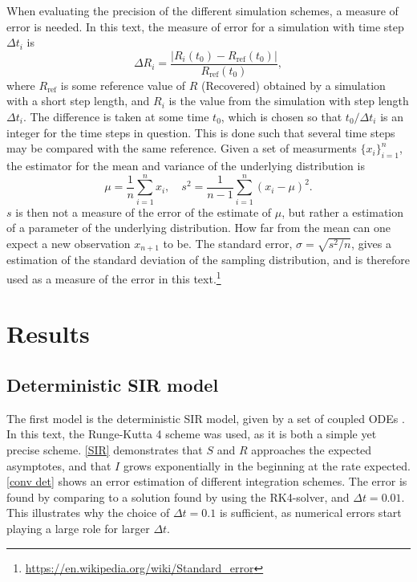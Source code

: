 \documentclass{article}
\begin{document}
    When evaluating the precision of the different simulation schemes, a measure of error is needed.
    In this text, the measure of error for a simulation with time step $\Delta t_i$ is
    \begin{equation*}
        \Delta R_i = \frac{|R_i(t_0) - R_{\mathrm{ref}}(t_0)|}{R_{\mathrm{ref}}(t_0)},
    \end{equation*}
    where $R_{\mathrm{ref}}$ is some reference value of $R$ (Recovered) obtained by a simulation with a short step length, and $R_i$ is the value from the simulation with step length $\Delta t_i$.
    The difference is taken at some time $t_0$, which is chosen so that $t_0/\Delta t_i$ is an integer for the time steps in question.
    This is done such that several time steps may be compared with the same reference.
    Given a set of measurments $\{x_i\}_{i=1}^n$, the estimator for the mean and variance of the underlying distribution is 
    \begin{equation*}
        \mu = \frac{1}{n}\sum_{i=1}^n x_i, \quad s^2 = \frac{1}{n-1} \sum_{i=1}^n (x_i - \mu)^2.
    \end{equation*}
    $s$ is then not a measure of the error of the estimate of $\mu$, but rather a estimation of a parameter of the underlying distribution.
    How far from the mean can one expect a new observation $x_{n+1}$ to be.
    The standard error, $\sigma = \sqrt{s^2/n}$, gives a estimation of the standard deviation of the sampling distribution, and is therefore used as a measure of the error in this text.\footnote{\url{https://en.wikipedia.org/wiki/Standard_error}} 
    \section*{Results}
    \subsection*{Deterministic SIR model}
    The first model is the deterministic SIR model, given by a set of coupled ODEs \cite{exam}. 
    In this text, the Runge-Kutta 4 scheme was used, as it is both a simple yet precise scheme.
    \autoref{SIR} demonstrates that $S$ and $R$ approaches the expected asymptotes, and that $I$ grows exponentially in the beginning at the rate expected.
    \autoref{conv det} shows an error estimation of different integration schemes.
    The error is found by comparing to a solution found by using the RK4-solver, and $\Delta t = 0.01$.
    This illustrates why the choice of $\Delta t = 0.1$ is sufficient, as numerical errors start playing a large role for larger $\Delta t$.
    
\end{document}
